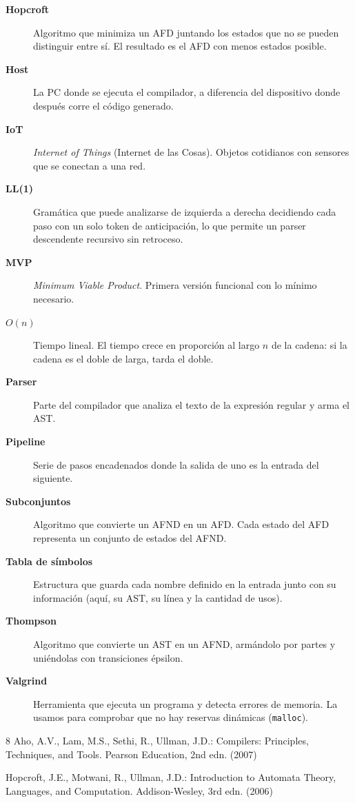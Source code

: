 \documentclass[runningheads]{llncs}
\begin{document}
\begin{description}
  \item[\textbf{Hopcroft}] Algoritmo que minimiza un AFD juntando los estados que no se pueden distinguir entre sí. El resultado es el AFD con menos estados posible.
  \item[\textbf{Host}] La PC donde se ejecuta el compilador, a diferencia del dispositivo donde después corre el código generado.
  \item[\textbf{IoT}] \emph{Internet of Things} (Internet de las Cosas). Objetos cotidianos con sensores que se conectan a una red.
  \item[\textbf{LL(1)}] Gramática que puede analizarse de izquierda a derecha decidiendo cada paso con un solo token de anticipación, lo que permite un parser descendente recursivo sin retroceso.
  \item[\textbf{MVP}] \emph{Minimum Viable Product}. Primera versión funcional con lo mínimo necesario.
  \item[\textbf{$O(n)$}] Tiempo lineal. El tiempo crece en proporción al largo $n$ de la cadena: si la cadena es el doble de larga, tarda el doble.
  \item[\textbf{Parser}] Parte del compilador que analiza el texto de la expresión regular y arma el AST.
  \item[\textbf{Pipeline}] Serie de pasos encadenados donde la salida de uno es la entrada del siguiente.
  \item[\textbf{Subconjuntos}] Algoritmo que convierte un AFND en un AFD. Cada estado del AFD representa un conjunto de estados del AFND.
  \item[\textbf{Tabla de símbolos}] Estructura que guarda cada nombre definido en la entrada junto con su información (aquí, su AST, su línea y la cantidad de usos).
  \item[\textbf{Thompson}] Algoritmo que convierte un AST en un AFND, armándolo por partes y uniéndolas con transiciones épsilon.
  \item[\textbf{Valgrind}] Herramienta que ejecuta un programa y detecta errores de memoria. La usamos para comprobar que no hay reservas dinámicas (\texttt{malloc}).
\end{description}
\normalsize

\begin{thebibliography}{8}
Aho, A.V., Lam, M.S., Sethi, R., Ullman, J.D.: Compilers: Principles, Techniques, and Tools. Pearson Education, 2nd edn. (2007)

Hopcroft, J.E., Motwani, R., Ullman, J.D.: Introduction to Automata Theory, Languages, and Computation. Addison-Wesley, 3rd edn. (2006)


\end{thebibliography}
\end{document}
